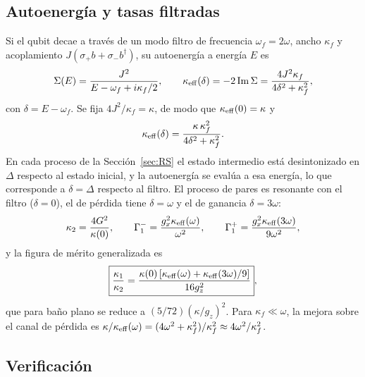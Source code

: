 \documentclass[11pt]{report}
\newcommand{\spl}{\sigma_{+}}
\newcommand{\smi}{\sigma_{-}}
\begin{document}
\subsection{Autoenerg\'ia y tasas filtradas}

Si el qubit decae a trav\'es de un modo filtro de frecuencia $\omega_{f}=2\omega$, ancho $\kappa_{f}$ y acoplamiento $J(\spl b+\smi b^{\dagger})$, su autoenerg\'ia a energ\'ia $E$ es
\begin{equation}
\Sigma(E)=\frac{J^{2}}{E-\omega_{f}+i\kappa_{f}/2},\qquad \kappa_{\rm eff}(\delta)=-2\,{\rm Im}\,\Sigma=\frac{4J^{2}\kappa_{f}}{4\delta^{2}+\kappa_{f}^{2}},
\end{equation}
con $\delta=E-\omega_{f}$. Se fija $4J^{2}/\kappa_{f}=\kappa$, de modo que $\kappa_{\rm eff}(0)=\kappa$ y
\begin{equation}
\kappa_{\rm eff}(\delta)=\frac{\kappa\,\kappa_{f}^{2}}{4\delta^{2}+\kappa_{f}^{2}}.
\end{equation}
En cada proceso de la Secci\'on~\ref{sec:RS} el estado intermedio est\'a desintonizado en $\Delta$ respecto al estado inicial, y la autoenerg\'ia se eval\'ua a esa energ\'ia, lo que corresponde a $\delta=\Delta$ respecto al filtro. El proceso de pares es resonante con el filtro ($\delta=0$), el de p\'erdida tiene $\delta=\omega$ y el de ganancia $\delta=3\omega$:
\begin{equation}
\kappa_{2}=\frac{4G^{2}}{\kappa(0)},\qquad \Gamma_{1}^{-}=\frac{g_{x}^{2}\kappa_{\rm eff}(\omega)}{\omega^{2}},\qquad \Gamma_{1}^{+}=\frac{g_{x}^{2}\kappa_{\rm eff}(3\omega)}{9\omega^{2}},
\end{equation}
y la figura de m\'erito generalizada es
\begin{equation}
\boxed{\frac{\kappa_{1}}{\kappa_{2}}=\frac{\kappa(0)\left[\kappa_{\rm eff}(\omega)+\kappa_{\rm eff}(3\omega)/9\right]}{16g_{z}^{2}}},
\end{equation}
que para baño plano se reduce a $(5/72)(\kappa/g_{z})^{2}$. Para $\kappa_{f}\ll\omega$, la mejora sobre el canal de p\'erdida es $\kappa/\kappa_{\rm eff}(\omega)=(4\omega^{2}+\kappa_{f}^{2})/\kappa_{f}^{2}\approx4\omega^{2}/\kappa_{f}^{2}$.

\subsection{Verificaci\'on}
\end{document}
